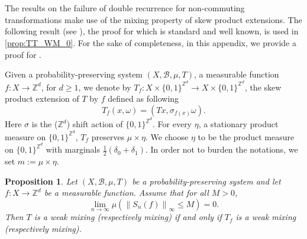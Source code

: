 \documentclass[12pt,reqno]{amsart}
\newcommand{\Z}{\mathbb{Z}}
\newcommand{\B}{\mathcal{B}}
\newtheorem{prop}[thm]{Proposition}
\theoremstyle{definition}
\begin{document}
\appendix
\section{}\label{App_1}
The results on the failure of double recurrence for non-commuting transformations make use of the mixing property of skew product extensions. The following result (see ), the proof for which is standard and well known, is used in \cref{prop:TT_WM_0}. For the sake of completeness, in this appendix, we provide a proof for . 

Given a probability-preserving system $(X,\B,\mu,T)$, a measurable function $f:X\to \mathbb{Z}^d$, for $d\geq 1$, we denote by $T_f:X\times \{0,1\}^{\Z^d}\to X\times \{0,1\}^{\Z^d}$, the skew product extension of $T$ by $f$ defined as following
\[
T_f(x,\omega)=(Tx,\sigma_{f(x)}\omega).
\]
Here $\sigma$ is the ($\Z^d$) shift action of $\{0,1\}^{\Z^d}$. For every $\eta$, a stationary product measure on $\{0,1\}^{\Z^d}$, $T_f$ preserves $\mu\times \eta$. We choose $\eta$ to be the product measure on $\{0,1\}^{\Z^d}$ with marginals $\frac{1}{2}\left(\delta_{0}+\delta_1\right)$. In order not to burden the notations, we set $m :=\mu\times \eta$. 
\begin{prop}\label{prop:WM}
Let $(X,\B,\mu,T)$ be a probability-preserving system and let $f:X\to \mathbb{Z}^d$ be a measurable function. Assume that for all $M>0$, 
\[
\lim_{n\to\infty}\mu\left(\left\|S_n(f)\right\|_\infty\leq M\right)=0.
\]
Then $T$ is a  weak mixing (respectively mixing) if and only if $T_f$ is a weak mixing (respectively mixing). 
\end{prop}
\end{document}

